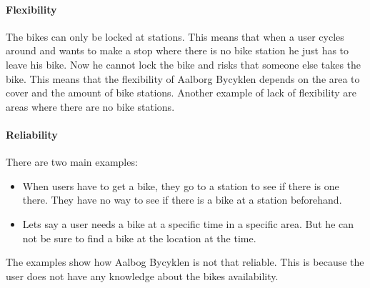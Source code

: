 \paragraph{Flexibility}
The bikes can only be locked at stations.
This means that when a user cycles around and wants to make a stop where there is no bike station he just has to leave his bike.
Now he cannot lock the bike and risks that someone else takes the bike.
This means that the flexibility of Aalborg Bycyklen depends on the area to cover and the amount of bike stations.
Another example of lack of flexibility are areas where there are no bike stations.


\paragraph{Reliability}
There are two main examples:
\begin{itemize}
\item When users have to get a bike, they go to a station to see if there is one there.
They have no way to see if there is a bike at a station beforehand.
\item Lets say a user needs a bike at a specific time in a specific area.
But he can not be sure to find a bike at the location at the time.
\end{itemize}
The examples show how Aalbog Bycyklen is not that reliable.
This is because the user does not have any knowledge about the bikes availability.